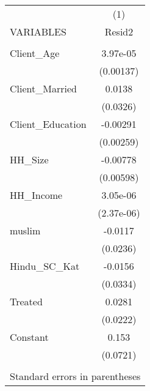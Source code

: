 \begin{tabular}{lc} \hline
 & (1) \\
VARIABLES & Resid2 \\ \hline
 &  \\
Client\_Age & 3.97e-05 \\
 & (0.00137) \\
Client\_Married & 0.0138 \\
 & (0.0326) \\
Client\_Education & -0.00291 \\
 & (0.00259) \\
HH\_Size & -0.00778 \\
 & (0.00598) \\
HH\_Income & 3.05e-06 \\
 & (2.37e-06) \\
muslim & -0.0117 \\
 & (0.0236) \\
Hindu\_SC\_Kat & -0.0156 \\
 & (0.0334) \\
Treated & 0.0281 \\
 & (0.0222) \\
Constant & 0.153 \\
 & (0.0721) \\
 &  \\ \hline
\multicolumn{2}{c}{ Standard errors in parentheses} \\
\end{tabular}
